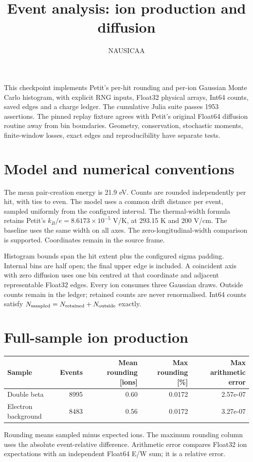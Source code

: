\documentclass[11pt]{article}
\begin{document}
\title{Event analysis: ion production and diffusion}
\author{NAUSICAA}\date{}\maketitle
This checkpoint implements Petit's per-hit rounding and per-ion Gaussian Monte
Carlo histogram, with explicit RNG inputs, Float32 physical arrays, Int64 counts,
saved edges and a charge ledger. The cumulative Julia suite passes 1953 assertions.
The pinned replay fixture agrees with Petit's original Float64 diffusion routine
away from bin boundaries. Geometry, conservation, stochastic moments, finite-window
losses, exact edges and reproducibility have separate tests.

\section*{Model and numerical conventions}
The mean pair-creation energy is 21.9 eV. Counts are rounded independently per
hit, with ties to even. The model uses a common drift distance per event, sampled
uniformly from the configured interval. The thermal-width formula retains Petit's
$k_B/e=8.6173\times10^{-5}$ V/K, at 293.15 K and 200 V/cm. The baseline uses
the same width on all axes. The zero-longitudinal-width comparison is supported.
Coordinates remain in the source frame.

Histogram bounds span the hit extent plus the configured sigma padding. Internal
bins are half open; the final upper edge is included. A coincident axis with zero
diffusion uses one bin centred at that coordinate and adjacent representable
Float32 edges. Every ion consumes three Gaussian draws. Outside counts remain in
the ledger; retained counts are never renormalised. Int64 counts satisfy
$N_{\rm sampled}=N_{\rm retained}+N_{\rm outside}$ exactly.

\section*{Full-sample ion production}
\begin{center}\small\begin{tabular}{lrrrr}\toprule
Sample & Events & Mean rounding [ions] & Max rounding [\%] & Max arithmetic error \\\midrule
Double beta & 8995 & 0.60 & 0.0172 & 2.57e-07 \\
Electron background & 8483 & 0.56 & 0.0172 & 3.27e-07 \\
\bottomrule\end{tabular}\end{center}
Rounding means sampled minus expected ions. The maximum rounding column uses
the absolute event-relative difference. Arithmetic error compares Float32 ion
expectations with an independent Float64 E/W sum; it is a relative error.
\end{document}
